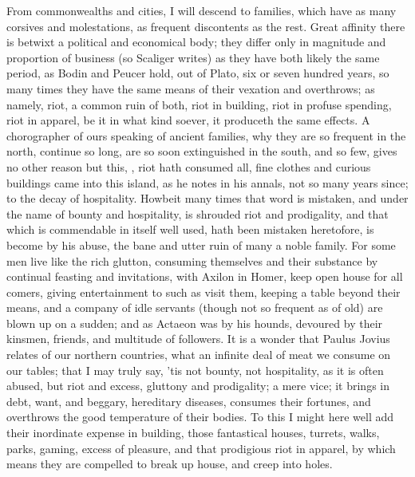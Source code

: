 From commonwealths and cities, I will descend to families, which have as many
corsives and molestations, as frequent discontents as the rest. Great affinity
there is betwixt a political and economical body; they differ only in magnitude
and proportion of business (so Scaliger writes) as they
have both likely the same period, as Bodin and
Peucer hold, out of Plato, six or seven hundred years, so
many times they have the same means of their vexation and overthrows; as
namely, riot, a common ruin of both, riot in building, riot in profuse
spending, riot in apparel, \etc{} be it in what kind soever, it produceth the
same effects. A chorographer of ours speaking 
of ancient families, why they are so frequent in the north, continue so long,
are so soon extinguished in the south, and so few, gives no other reason but
this, , riot hath consumed all, fine clothes and
curious buildings came into this island, as he notes in his annals, not so many
years since;  to the decay of
hospitality. Howbeit many times that word is mistaken, and under the name of
bounty and hospitality, is shrouded riot and prodigality, and that which is
commendable in itself well used, hath been mistaken heretofore, is become by
his abuse, the bane and utter ruin of many a noble family. For some men live
like the rich glutton, consuming themselves and their substance by continual
feasting and invitations, with Axilon in Homer, keep open
house for all comers, giving entertainment to such as visit them,
keeping a table beyond their means, and a company of idle
servants (though not so frequent as of old) are blown up on a sudden; and as
Actaeon was by his hounds, devoured by their kinsmen, friends, and multitude of
followers. It is a wonder that Paulus Jovius relates of our
northern countries, what an infinite deal of meat we consume on our tables;
that I may truly say, 'tis not bounty, not hospitality, as it is often abused,
but riot and excess, gluttony and prodigality; a mere vice; it brings in debt,
want, and beggary, hereditary diseases, consumes their fortunes, and overthrows
the good temperature of their bodies. To this I might here well add their
inordinate expense in building, those fantastical houses, turrets, walks,
parks, \etc{} gaming, excess of pleasure, and that prodigious riot in apparel,
by which means they are compelled to break up house, and creep into holes.
